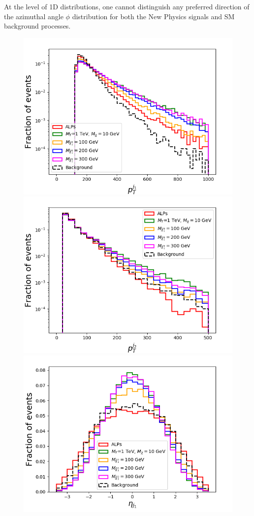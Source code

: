 \documentclass[prd,aps,letterpaper,floatfix,superscriptaddress,preprintnumbers,twocolumn,10pt,nofootinbib]{revtex4-1}
\begin{document}
At the level of 1D distributions, one cannot distinguish any preferred direction of the azimuthal angle $\phi$ distribution for both the New Physics signals and SM background processes.
\begin{figure}[t!]
\centering
\includegraphics[scale=0.4]{figures/ptj1allsbdelphesdijet.png}
\includegraphics[scale=0.4]{figures/ptj2allsbdelphesdijet.png}\\
\includegraphics[scale=0.4]{figures/etaj1allsbdelphesdijet.png}

\end{figure}
\end{document}

